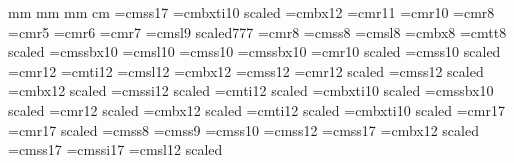 \newdimen\leftindent
\newdimen\bangindent
{}
\newcount\bangnumber
\def\item#1{\noindent\llap{\hbox to \leftindent{\hskip\bangindent#1\hfil}}}
\def\!{\noindent\llap{\hbox to \leftindent{\hskip\bangindent$\Rightarrow$ \hfil}}}
\def\B#1{\noindent\llap{\hbox to \leftindent{\hskip#1$\Rightarrow$ \hfil}}}
\def\.{\noindent\llap{\hbox to \leftindent{\hskip\bangindent$\bullet$ \hfil}}}
\def\bang{\noindent\llap{\hbox to \leftindent{\hskip\bangindent$\Rightarrow$ \hfil}}}
\def\s{\spacefactor2000}
\def\MB{\nobreak\quad MB}
\def\nl{\hfil\break}
\def\leftmargin#1{\leftindent#1\leftskip\leftindent\bangnumber1}
\def\numitem#1{\advance\bangnumber by1\noindent\llap{\hbox to\leftindent{\hskip\bangindent\number\bangnumber#1\hfil}}}
\def\N{\advance\bangnumber by1\noindent\llap{\hbox to\leftindent{\hskip\bangindent\number\bangnumber.\hfil}}}
\def\bull{$\bullet$}
\parskip3mm mm      %
     mm
     mm
     cm
\font\huge=cmss17
\font\hugeit=cmbxti10 scaled
\font\Big=cmbx12
\font\big=cmr11
\font\std=cmr10
\font\small=cmr8
\font\fiverm=cmr5
\font\sixrm=cmr6
\font\sevenrm=cmr7
\font\sevensl=cmsl9 scaled777
\font\eightrm=cmr8
\font\eightss=cmss8
\font\eightsl=cmsl8
\font\eightbx=cmbx8
\font\mailid=cmtt8 scaled	
\font\tenssbx=cmssbx10
\font\tensl=cmsl10
\font\tenss=cmss10
\font\tenssbx=cmssbx10
\font\elevenrm=cmr10 scaled
\font\elevenss=cmss10 scaled
\font\twelverm=cmr12
\font\twelveit=cmti12
\font\twelvesl=cmsl12
\font\twelvebf=cmbx12
\font\twelvess=cmss12
\font\fourteenrm=cmr12 scaled
\font\fourteenss=cmss12 scaled
\font\fourteenbf=cmbx12 scaled
\font\fourteenssit=cmssi12 scaled
\font\fourteenit=cmti12 scaled
\font\fourteenbit=cmbxti10 scaled
\font\fourteenssbx=cmssbx10 scaled
\font\rmfourteen=cmr12 scaled
\font\bfseventeen=cmbx12 scaled
\font\seventeenit=cmti12 scaled
\font\seventeenbit=cmbxti10 scaled
\font\seventeenrm=cmr17
\font\twentyfourrm=cmr17 scaled
\font\sseight=cmss8
\font\niness=cmss9
\font\tenss=cmss10
\font\sstwelve=cmss12
\font\ssseventeen=cmss17
\font\seventeenbf=cmbx12 scaled
\font\seventeenss=cmss17
\font\seventeensssi=cmssi17
\font\seventeensl=cmsl12 scaled
